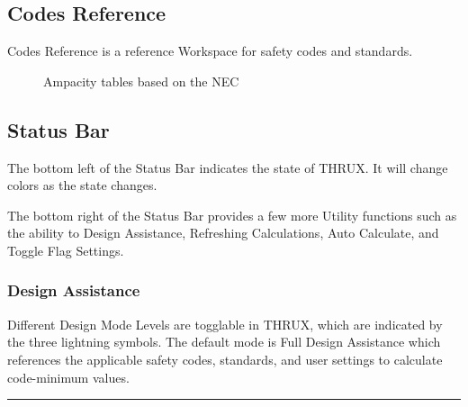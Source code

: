 \documentclass[letterpaper,10pt,english]{sphinxmanual}
\begin{document}
\subsection{Codes Reference}
\label{\detokenize{docs/userguide/explorersandutilitytools/codesreference/index-codes_reference:codes-reference}}\label{\detokenize{docs/userguide/explorersandutilitytools/codesreference/index-codes_reference:id1}}\label{\detokenize{docs/userguide/explorersandutilitytools/codesreference/index-codes_reference::doc}}
Codes Reference is a reference Workspace for safety codes and standards.

\begin{figure}[H]
\centering
\capstart

\noindent{}
\caption{Ampacity tables based on the NEC}\label{\detokenize{docs/userguide/explorersandutilitytools/codesreference/index-codes_reference:id2}}\end{figure}


\subsection{Status Bar}
\label{\detokenize{docs/userguide/explorersandutilitytools/statusbar/index-status_bar:status-bar}}\label{\detokenize{docs/userguide/explorersandutilitytools/statusbar/index-status_bar:id1}}\label{\detokenize{docs/userguide/explorersandutilitytools/statusbar/index-status_bar::doc}}
The bottom left of the Status Bar indicates the state of THRUX.  It will change colors as the state changes.

The bottom right of the Status Bar provides a few more Utility functions such as the ability to Design Assistance, Refreshing Calculations, Auto Calculate, and Toggle Flag Settings.


\subsubsection{Design Assistance}
\label{\detokenize{docs/userguide/explorersandutilitytools/statusbar/index-status_bar:design-assistance}}\label{\detokenize{docs/userguide/explorersandutilitytools/statusbar/index-status_bar:id2}}
Different Design Mode Levels are togglable in THRUX, which are indicated by the three lightning symbols.  The default mode is Full Design Assistance which references the applicable safety codes, standards, and user settings to calculate code-minimum values.


\bigskip\hrule\bigskip
\end{document}
